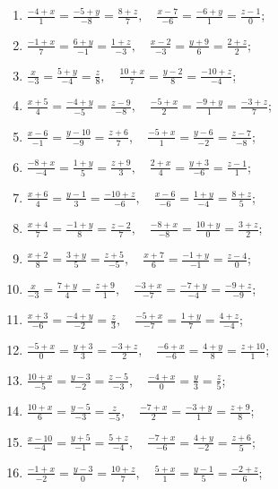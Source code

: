 	\vspace{10pt}
	\begin{enumerate}
		\setcounter{enumi}{\value{tasks}}

			\item \( \displaystyle \frac{-4+x}{1} = \frac{-5+y}{-8} = \frac{8+z}{7}, \quad \frac{x-7}{-6} = \frac{-6+y}{1} = \frac{z-1}{0} \);
			\item \( \displaystyle \frac{-1+x}{7} = \frac{6+y}{-1} = \frac{1+z}{-3}, \quad \frac{x-2}{-3} = \frac{y+9}{6} = \frac{2+z}{2} \);
			\item \( \displaystyle \frac{x}{-3} = \frac{5+y}{-4} = \frac{z}{8}, \quad \frac{10+x}{7} = \frac{y-2}{8} = \frac{-10+z}{-4} \);
			\item \( \displaystyle \frac{x+5}{4} = \frac{-4+y}{-5} = \frac{z-9}{-8}, \quad \frac{-5+x}{2} = \frac{-9+y}{1} = \frac{-3+z}{7} \);
			\item \( \displaystyle \frac{x-6}{-1} = \frac{y-10}{-9} = \frac{z+6}{7}, \quad \frac{-5+x}{1} = \frac{y-6}{-2} = \frac{z-7}{-8} \);
			\item \( \displaystyle \frac{-8+x}{-4} = \frac{1+y}{5} = \frac{z+9}{3}, \quad \frac{2+x}{4} = \frac{y+3}{-6} = \frac{z-1}{1} \);
			\item \( \displaystyle \frac{x+6}{4} = \frac{y-1}{3} = \frac{-10+z}{-6}, \quad \frac{x-6}{-6} = \frac{1+y}{-4} = \frac{8+z}{5} \);
			\item \( \displaystyle \frac{x+4}{7} = \frac{-1+y}{8} = \frac{z-2}{7}, \quad \frac{-8+x}{-8} = \frac{10+y}{0} = \frac{3+z}{2} \);
			\item \( \displaystyle \frac{x+2}{8} = \frac{3+y}{5} = \frac{z+5}{-5}, \quad \frac{x+7}{6} = \frac{-1+y}{-1} = \frac{z-4}{0} \);
			\item \( \displaystyle \frac{x}{-3} = \frac{7+y}{4} = \frac{z+9}{1}, \quad \frac{-3+x}{-7} = \frac{-7+y}{-4} = \frac{-9+z}{-9} \);
			\item \( \displaystyle \frac{x+3}{-6} = \frac{-4+y}{-2} = \frac{z}{3}, \quad \frac{-5+x}{-7} = \frac{1+y}{7} = \frac{4+z}{-4} \);
			\item \( \displaystyle \frac{-5+x}{0} = \frac{y+3}{3} = \frac{-3+z}{2}, \quad \frac{-6+x}{-6} = \frac{4+y}{8} = \frac{z+10}{1} \);
			\item \( \displaystyle \frac{10+x}{-5} = \frac{y-3}{-2} = \frac{z-5}{-3}, \quad \frac{-4+x}{0} = \frac{y}{3} = \frac{z}{5} \);
			\item \( \displaystyle \frac{10+x}{6} = \frac{y-5}{-3} = \frac{z}{-5}, \quad \frac{-7+x}{2} = \frac{-3+y}{1} = \frac{z+9}{8} \);
			\item \( \displaystyle \frac{x-10}{-4} = \frac{y+5}{-1} = \frac{5+z}{-4}, \quad \frac{-7+x}{-6} = \frac{4+y}{-2} = \frac{z+6}{5} \);
			\item \( \displaystyle \frac{-1+x}{-2} = \frac{y-3}{0} = \frac{10+z}{7}, \quad \frac{5+x}{1} = \frac{y-1}{5} = \frac{-2+z}{6} \);

		\setcounter{tasks}{\value{enumi}}
	\end{enumerate}

